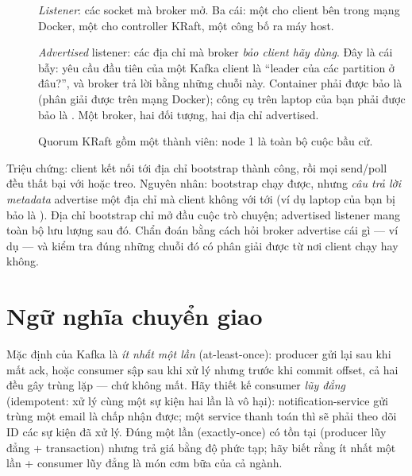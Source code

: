 \begin{description}
  \item[] \emph{Listener}: các socket mà broker mở. Ba cái: một cho
  client bên trong mạng Docker, một cho controller KRaft, một công bố ra
  máy host.
  \item[] \emph{Advertised} listener: các địa chỉ mà broker
  \emph{bảo client hãy dùng}. Đây là cái bẫy: yêu cầu đầu tiên của một
  Kafka client là ``leader của các partition ở đâu?'', và broker trả lời
  bằng những chuỗi này. Container phải được bảo là 
  (phân giải được trên mạng Docker); công cụ trên laptop của bạn phải
  được bảo là . Một broker, hai đối tượng, hai địa
  chỉ advertised.
  \item[] Quorum KRaft gồm một thành viên: node 1 là toàn bộ cuộc
  bầu cử.
\end{description}

\begin{pitfall}
Triệu chứng: client kết nối tới địa chỉ bootstrap thành công, rồi mọi
send/poll đều thất bại với  hoặc treo. Nguyên nhân: bootstrap chạy được, nhưng
\emph{câu trả lời metadata} advertise một địa chỉ mà client không với
tới (ví dụ laptop của bạn bị bảo là ). Địa chỉ
bootstrap chỉ mở đầu cuộc trò chuyện; advertised listener mang toàn bộ
lưu lượng sau đó. Chẩn đoán bằng cách hỏi broker advertise cái gì ---
ví dụ  --- và kiểm tra đúng những chuỗi
đó có phân giải được từ nơi client chạy hay không.
\end{pitfall}

\section{Ngữ nghĩa chuyển giao}

Mặc định của Kafka là \emph{ít nhất một lần} (at-least-once): producer
gửi lại sau khi mất ack, hoặc consumer sập sau khi xử lý nhưng trước khi
commit offset, cả hai đều gây trùng lặp --- chứ không mất. Hãy thiết kế
consumer \emph{lũy đẳng} (idempotent: xử lý cùng một sự kiện hai lần là
vô hại): notification-service gửi trùng một email là chấp nhận được; một
service thanh toán thì sẽ phải theo dõi ID các sự kiện đã xử lý. Đúng
một lần (exactly-once) có tồn tại (producer lũy đẳng + transaction)
nhưng trả giá bằng độ phức tạp; hãy biết rằng ít nhất một lần + consumer
lũy đẳng là món cơm bữa của cả ngành.

